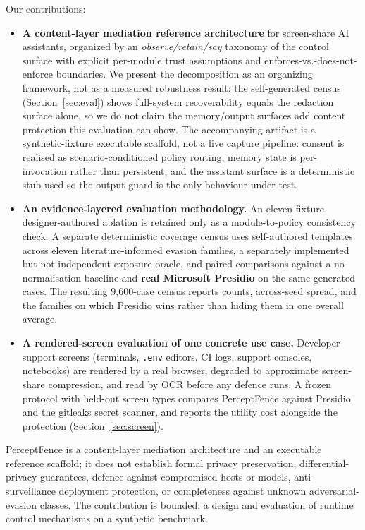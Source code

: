 \documentclass[pdflatex,sn-mathphys-num]{sn-jnl}
\begin{document}
Our contributions:

\begin{itemize}
  \item \textbf{A content-layer mediation reference architecture} for
        screen-share AI assistants, organized by an \textit{observe/retain/say}
        taxonomy of the control surface with explicit per-module trust
        assumptions and enforces-vs.-does-not-enforce boundaries. We present the
        decomposition as an organizing framework, not as a measured robustness
        result: the self-generated census (Section~\ref{sec:eval}) shows full-system
        recoverability equals the redaction surface alone, so we do not claim the
        memory/output surfaces add content protection this evaluation can show.
        The accompanying artifact is a synthetic-fixture executable scaffold,
        not a live capture pipeline: consent is realised as scenario-conditioned
        policy routing, memory state is per-invocation rather than persistent,
        and the assistant surface is a deterministic stub used so the output
        guard is the only behaviour under test.
  \item \textbf{An evidence-layered evaluation methodology.} An eleven-fixture
        designer-authored ablation is retained only as a module-to-policy
        consistency check. A separate deterministic coverage census uses
        self-authored templates across eleven literature-informed evasion families,
        a separately implemented but not independent exposure oracle, and paired
        comparisons against a no-normalisation baseline and \textbf{real Microsoft
        Presidio} on the same generated cases.
        The resulting 9{,}600-case census
        reports counts, across-seed spread, and the families on which Presidio
        wins rather than hiding them in one overall average.
  \item \textbf{A rendered-screen evaluation of one concrete use case.}
        Developer-support screens (terminals, \texttt{.env} editors, CI logs,
        support consoles, notebooks) are rendered by a real browser, degraded
        to approximate screen-share compression, and read by OCR before any
        defence runs. A frozen protocol with held-out screen types compares
        PerceptFence against Presidio and the gitleaks secret scanner, and
        reports the utility cost alongside the protection
        (Section~\ref{sec:screen}).
\end{itemize}

PerceptFence is a content-layer mediation architecture and an executable
reference scaffold; it does not establish formal privacy preservation,
differential-privacy guarantees, defence against compromised hosts or models,
anti-surveillance deployment protection, or completeness against unknown
adversarial-evasion classes.
The contribution is bounded: a design and evaluation of runtime control
mechanisms on a synthetic benchmark.
\end{document}
